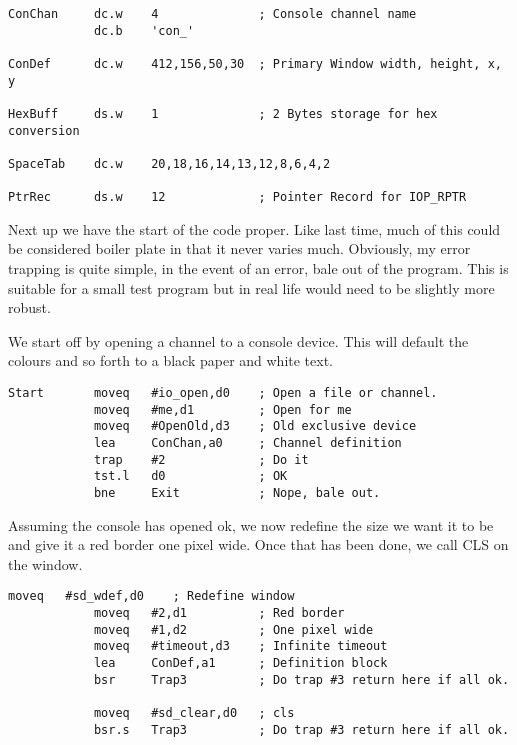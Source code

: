 \begin{lstlisting}[firstnumber=last,caption={Pointer Record Examiner - Definitions}]
ConChan     dc.w    4              ; Console channel name 
            dc.b    'con_'

ConDef      dc.w    412,156,50,30  ; Primary Window width, height, x, y

HexBuff     ds.w    1              ; 2 Bytes storage for hex conversion

SpaceTab    dc.w    20,18,16,14,13,12,8,6,4,2

PtrRec      ds.w    12             ; Pointer Record for IOP_RPTR
\end{lstlisting}

Next up we have the start of the code proper. Like last time, much of this could be
considered boiler plate in that it never varies much. Obviously, my error trapping is
quite simple, in the event of an error, bale out of the program. This is suitable for a
small test program but in real life would need to be slightly more robust.

We start off by opening a channel to a console device. This will default the colours and
so forth to a black paper and white text.

\begin{lstlisting}[firstnumber=last,caption={Pointer Record Examiner - Open Console}]
Start       moveq   #io_open,d0    ; Open a file or channel.
            moveq   #me,d1         ; Open for me
            moveq   #OpenOld,d3    ; Old exclusive device
            lea     ConChan,a0     ; Channel definition
            trap    #2             ; Do it
            tst.l   d0             ; OK
            bne     Exit           ; Nope, bale out.
\end{lstlisting}

Assuming the console has opened ok, we now redefine the size we want it to be and give it
a red border one pixel wide. Once that has been done, we call CLS on the window.

\begin{lstlisting}[firstnumber=last,caption={Pointer Record Examiner - Redefine Console}]
            moveq   #sd_wdef,d0    ; Redefine window
            moveq   #2,d1          ; Red border
            moveq   #1,d2          ; One pixel wide
            moveq   #timeout,d3    ; Infinite timeout
            lea     ConDef,a1      ; Definition block
            bsr     Trap3          ; Do trap #3 return here if all ok.

            moveq   #sd_clear,d0   ; cls
            bsr.s   Trap3          ; Do trap #3 return here if all ok.
\end{lstlisting}

